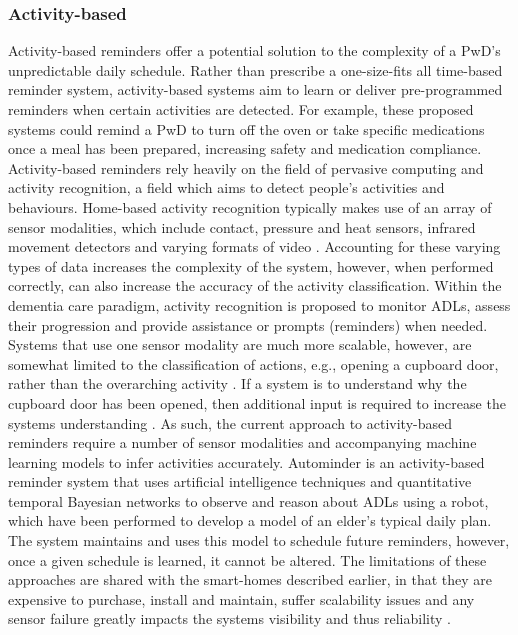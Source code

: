 \subsubsection{Activity-based}
Activity-based reminders offer a potential solution to the complexity of a PwD's unpredictable daily schedule. Rather than prescribe a one-size-fits all time-based reminder system, activity-based systems aim to learn or deliver pre-programmed reminders when certain activities are detected. For example, these proposed systems could remind a PwD to turn off the oven or take specific medications once a meal has been prepared, increasing safety and medication compliance.
Activity-based reminders rely heavily on the field of pervasive computing and activity recognition, a field which aims to detect people's activities and behaviours. Home-based activity recognition typically makes use of an array of sensor modalities, which include contact, pressure and heat sensors, infrared movement detectors and varying formats of video \cite{Chen2012b}. Accounting for these varying types of data increases the complexity of the system, however, when performed correctly, can also increase the accuracy of the activity classification. Within the dementia care paradigm, activity recognition is proposed to monitor ADLs, assess their progression and provide assistance or prompts (reminders) when needed. Systems that use one sensor modality are much more scalable, however, are somewhat limited to the classification of actions, e.g., opening a cupboard door, rather than the overarching activity \cite{Chen2012b, Patterson2015}. If a system is to understand why the cupboard door has been opened, then additional input is required to increase the systems understanding \cite{Chen2012}. As such, the current approach to activity-based reminders require a number of sensor modalities and accompanying machine learning models to infer activities accurately. Autominder \cite{Pollack2003} is an activity-based reminder system that uses artificial intelligence techniques and quantitative temporal Bayesian networks to observe and reason about ADLs using a robot, which have been performed to develop a model of an elder’s typical daily plan. The system maintains and uses this model to schedule future reminders, however, once a given schedule is learned, it cannot be altered.
The limitations of these approaches are shared with the smart-homes described earlier, in that they are expensive to purchase, install and maintain, suffer scalability issues \cite{Wilson2015a} and any sensor failure greatly impacts the systems visibility and thus reliability \cite{Ye2015}.

